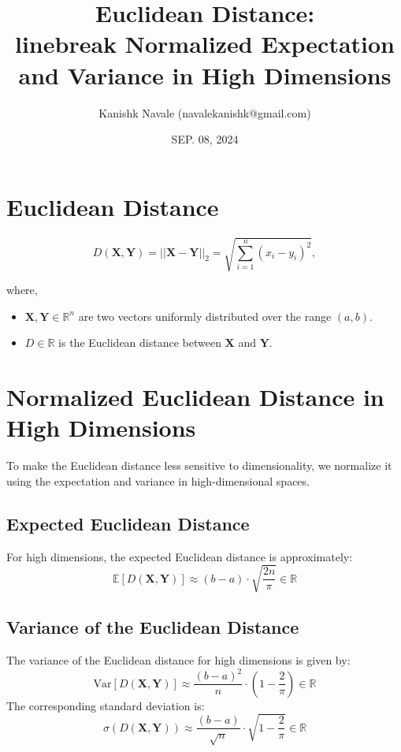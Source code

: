 \documentclass{article}
\title{Euclidean Distance:\\linebreak Normalized Expectation and Variance in High Dimensions}
\author{Kanishk Navale (navalekanishk@gmail.com)}
\date{SEP. 08, 2024}
\begin{document}
\maketitle

\section{Euclidean Distance}
\begin{equation}
    D(\mathbf{X}, \mathbf{Y}) = \vert\vert \mathbf{X} - \mathbf{Y} \vert\vert_2 = \sqrt{\sum_{i=1}^{n} (x_i - y_i)^2},
\end{equation}

where,
\begin{itemize}
    \item $\mathbf{X}, \mathbf{Y} \in \mathbb{R}^n$ are two vectors uniformly distributed over the range $(a, b)$.
    \item $D \in \mathbb{R}$ is the Euclidean distance between $\mathbf{X}$ and $\mathbf{Y}$.
\end{itemize}

\section{Normalized Euclidean Distance in High Dimensions}
To make the Euclidean distance less sensitive to dimensionality, we normalize it using the expectation and variance in high-dimensional spaces.

\subsection{Expected Euclidean Distance}
For high dimensions, the expected Euclidean distance is approximately:
\begin{equation}
    \mathbb{E}[D(\mathbf{X}, \mathbf{Y})] \approx (b - a) \cdot \sqrt{\frac{2n}{\pi}} \in \mathbb{R}
\end{equation}

\subsection{Variance of the Euclidean Distance}
The variance of the Euclidean distance for high dimensions is given by:
\begin{equation}
    \text{Var}[D(\mathbf{X}, \mathbf{Y})] \approx \frac{(b - a)^2}{n} \cdot \left(1 - \frac{2}{\pi}\right) \in \mathbb{R}
\end{equation}
The corresponding standard deviation is:
\begin{equation}
    \sigma(D(\mathbf{X}, \mathbf{Y})) \approx \frac{(b - a)}{\sqrt{n}} \cdot \sqrt{1 - \frac{2}{\pi}} \in \mathbb{R}
\end{equation}
\end{document}

